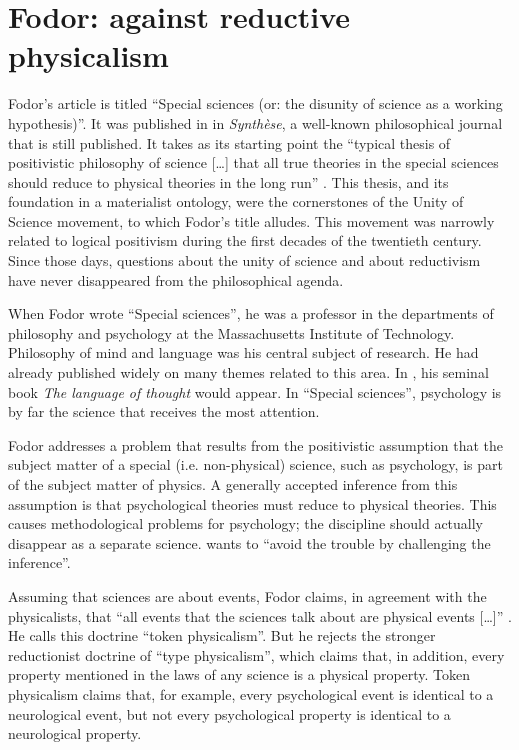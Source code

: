 \documentclass[output=paper]{langscibook}
\begin{document}
\section{Fodor: against reductive physicalism}
\label{sec:elffers:tokenphysicalism}

Fodor's article is titled ``Special sciences (or: the disunity of science as a working hypothesis)''. It was published in \citeyear{Fodor1974} in \emph{Synthèse}, a well-known philosophical journal that is still published. It takes as its starting point the ``typical thesis of positivistic philosophy of science […] that all true theories in the special sciences should reduce to physical theories in the long run'' \citep[97]{Fodor1974}. This thesis, and its foundation in a materialist ontology, were the cornerstones of the Unity of Science movement, to which Fodor's title alludes. This movement was narrowly related to logical positivism during the first decades of the twentieth century. Since those days, questions about the unity of science and about reductivism have never disappeared from the philosophical agenda.

When Fodor wrote ``Special sciences'', he was a professor in the departments of philosophy and psychology at the Massachusetts Institute of Technology. Philosophy of mind and language was his central subject of research. He had already published widely on many themes related to this area. In \citeyear{Fodor1975}, his seminal book \emph{The language of thought} would appear. In ``Special sciences'', psychology is by far the science that receives the most attention.

Fodor addresses a problem that results from the positivistic assumption that the subject matter of a special (i.e. non-physical) science, such as psychology, is part of the subject matter of physics. A generally accepted inference from this assumption is that psychological theories must reduce to physical theories. This causes methodological problems for psychology; the discipline should actually disappear as a separate science. \citet[98]{Fodor1974} wants to ``avoid the trouble by challenging the inference''.

Assuming that sciences are about events, Fodor claims, in agreement with the physicalists, that ``all events that the sciences talk about are physical events […]'' \citep[100]{Fodor1974}. He calls this doctrine ``token physicalism''. But he rejects the stronger reductionist doctrine of ``type physicalism'', which claims that, in addition, every property mentioned in the laws of any science is a physical property. Token physicalism claims that, for example, every psychological event is identical to a neurological event, but not every psychological property is identical to a neurological property.
\end{document}
